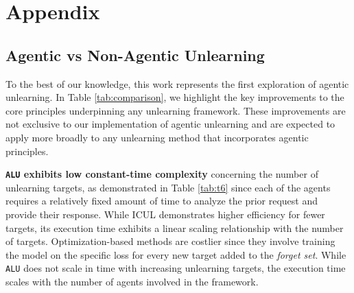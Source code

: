 \appendix

\setcounter{page}{1}

\newpage
\section{Appendix}


\subsection{Agentic vs Non-Agentic Unlearning}
\label{sec:6}
To the best of our knowledge, this work represents the first exploration of agentic unlearning. In Table \ref{tab:comparison}, we highlight the key improvements to the core principles underpinning any unlearning framework. These improvements are not exclusive to our implementation of agentic unlearning and are expected to apply more broadly to any unlearning method that incorporates agentic principles. 

\textbf{\texttt{ALU} exhibits low constant-time complexity} concerning the number of unlearning targets, as demonstrated in Table \ref{tab:t6} since each of the agents requires a relatively fixed amount of time to analyze the prior request and provide their response. While ICUL demonstrates higher efficiency for fewer targets, its execution time exhibits a linear scaling relationship with the number of targets. Optimization-based methods are costlier since they involve training the model on the specific loss for every new target added to the \emph{forget set}. While \texttt{ALU} does not scale in time with increasing unlearning targets, the execution time scales with the number of agents involved in the framework.

